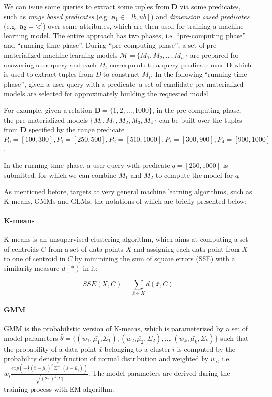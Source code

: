 We can issue some queries to extract some tuples from $\textbf{D}$ via some predicates, such as {\em range based predicates} (e.g. $\textbf{a}_1 \in [lb, ub]$) and {\em dimension based predicates} (e.g. $\textbf{a}_2 = `c'$) over some attributes, which are then used for training a machine learning model. The entire approach has two phases, i.e. ``pre-computing phase'' and ``running time phase''. During ``pre-computing phase'', a set of pre-materialized machine learning models $\mathcal{M} = \{M_1, M_2, \dots, M_n\}$ are prepared for answering user query and each $M_i$ corresponds to a query predicate over $\textbf{D}$ which is used to extract tuples from $D$ to construct $M_i$. In the following ``running time phase'', given a user query with a predicate, a set of candidate pre-materialized models are selected for approximately building the requested model.

\begin{example}\label{eg: two_phase_eg}
For example, given a relation $\textbf{D}=\{1,2,\dots, 1000\}$, in the pre-computing phase, the pre-materialized models $\{M_0, M_1, M_2, M_3, M_4\}$ can be built over the tuples from $\textbf{D}$ specified by the range predicate $P_0 = [100, 300], P_1 = [250, 500], P_2 = [500, 1000], P_3 = [300, 900], P_4 = [900, 1000]$. 

In the running time phase, a user query with predicate $q=[250, 1000]$ is submitted, for which we can combine $M_1$ and $M_2$ to compute the model for $q$.
\end{example}

As mentioned before, \cite{hasani2018efficient} targets at very general machine learning algorithms, such as K-means, GMMs and GLMs, the notations of which are briefly presented below:

\paragraph{K-means} K-means is an unsupervised clustering algorithm, which aims at computing a set of centroids $C$ from a set of data points $X$ and assigning each data point from $X$ to one of centroid in $C$ by minimizing the sum of square errors (SSE) with a similarity measure $d(*)$ in it:

\begin{equation}\label{eq: sse_k_means}
    SSE(X, C) = \sum_{\bar{x} \in X}d(\bar{x}, C)
\end{equation}

\paragraph{GMM} GMM is the probabilistic version of K-means, which is parameterized by a set of model parameters $\bar{\theta} = \{(w_1, \bar{\mu_1}, \Sigma_1), (w_2, \bar{\mu_2}, \Sigma_2), \dots, (w_k, \bar{\mu_k}, \Sigma_k)\}$ such that the probability of a data point $\bar{x}$ belonging to a cluster $i$ is computed by the probability density function of normal distribution and weighted by $w_i$, i.e.  $w_i\frac{exp(-\frac{1}{2}(\bar{x}-\bar{\mu}_i)^T\Sigma^{-1}(\bar{x}-\bar{\mu}_i))}{\sqrt{(2\pi)^k|\Sigma|}}$. The model parameters are derived during the training process with EM algorithm.

